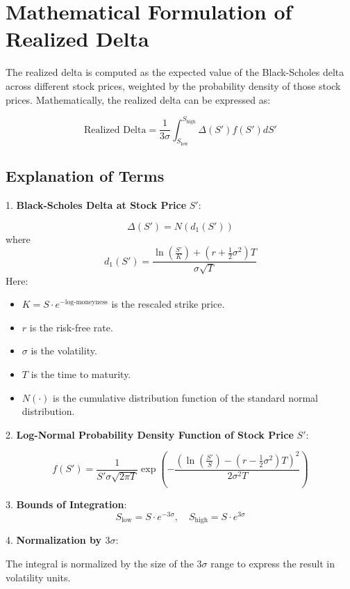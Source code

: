 \documentclass{article}
\begin{document}
\section*{Mathematical Formulation of Realized Delta}

The realized delta is computed as the expected value of the Black-Scholes delta across different stock prices, weighted by the probability density of those stock prices. Mathematically, the realized delta can be expressed as:

\[
\text{Realized Delta} = \frac{1}{3\sigma} \int_{S_{\text{low}}}^{S_{\text{high}}} \Delta(S') f(S') dS'
\]

\subsection*{Explanation of Terms}

1. \textbf{Black-Scholes Delta at Stock Price} \( S' \):

\[
\Delta(S') = N(d_1(S'))
\]
where
\[
d_1(S') = \frac{\ln\left( \frac{S'}{K} \right) + \left( r + \frac{1}{2}\sigma^2 \right)T}{\sigma \sqrt{T}}
\]
Here:
\begin{itemize}
    \item \( K = S \cdot e^{-\text{log-moneyness}} \) is the rescaled strike price.
    \item \( r \) is the risk-free rate.
    \item \( \sigma \) is the volatility.
    \item \( T \) is the time to maturity.
    \item \( N(\cdot) \) is the cumulative distribution function of the standard normal distribution.
\end{itemize}

2. \textbf{Log-Normal Probability Density Function of Stock Price} \( S' \):

\[
f(S') = \frac{1}{S' \sigma \sqrt{2 \pi T}} \exp\left( -\frac{\left( \ln\left( \frac{S'}{S} \right) - \left( r - \frac{1}{2}\sigma^2 \right)T \right)^2}{2 \sigma^2 T} \right)
\]

3. \textbf{Bounds of Integration}:
\[
S_{\text{low}} = S \cdot e^{-3\sigma}, \quad S_{\text{high}} = S \cdot e^{3\sigma}
\]

4. \textbf{Normalization by \( 3\sigma \)}:

The integral is normalized by the size of the \( 3\sigma \) range to express the result in volatility units.
\end{document}

